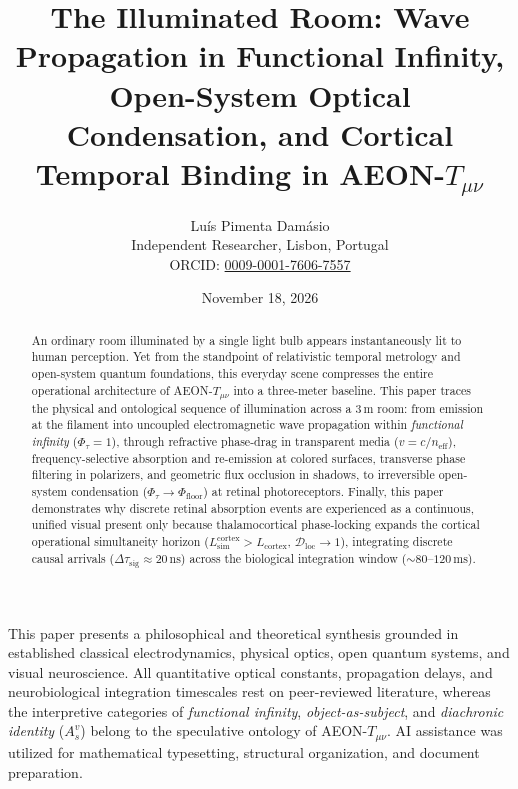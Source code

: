 \documentclass[11pt,a4paper]{article}
\title{\textbf{The Illuminated Room: Wave Propagation in Functional Infinity, Open-System Optical Condensation, and Cortical Temporal Binding in AEON-$T_{\mu\nu}$}}
\author{Lu\'is Pimenta Dam\'asio\\
\small Independent Researcher, Lisbon, Portugal\\
\small ORCID: \href{https://orcid.org/0009-0001-7606-7557}{0009-0001-7606-7557}}
\date{November 18, 2026}
\begin{document}
\maketitle

\begin{abstract}
An ordinary room illuminated by a single light bulb appears instantaneously lit to human perception. Yet from the standpoint of relativistic temporal metrology and open-system quantum foundations, this everyday scene compresses the entire operational architecture of AEON-$T_{\mu\nu}$ into a three-meter baseline. This paper traces the physical and ontological sequence of illumination across a $3\,\mathrm{m}$ room: from emission at the filament into uncoupled electromagnetic wave propagation within \emph{functional infinity} ($\Phi_\tau = 1$), through refractive phase-drag in transparent media ($v = c / n_{\mathrm{eff}}$), frequency-selective absorption and re-emission at colored surfaces, transverse phase filtering in polarizers, and geometric flux occlusion in shadows, to irreversible open-system condensation ($\Phi_\tau \to \Phi_{\mathrm{floor}}$) at retinal photoreceptors. Finally, this paper demonstrates why discrete retinal absorption events are experienced as a continuous, unified visual present only because thalamocortical phase-locking expands the cortical operational simultaneity horizon ($L_{\mathrm{sim}}^{\mathrm{cortex}} > L_{\mathrm{cortex}}$, $\mathcal{D}_{\mathrm{loc}} \to 1$), integrating discrete causal arrivals ($\Delta\tau_{\mathrm{sig}} \approx 20\,\mathrm{ns}$) across the biological integration window ($\sim 80\text{--}120\,\mathrm{ms}$).
\end{abstract}

\begin{tcolorbox}[colback=gray!6,colframe=gray!50,title=\textbf{Epistemic Status \& AI Collaboration Disclosure}]
\small
This paper presents a philosophical and theoretical synthesis grounded in established classical electrodynamics, physical optics, open quantum systems, and visual neuroscience. All quantitative optical constants, propagation delays, and neurobiological integration timescales rest on peer-reviewed literature, whereas the interpretive categories of \emph{functional infinity}, \emph{object-as-subject}, and \emph{diachronic identity} ($A_s^v$) belong to the speculative ontology of AEON-$T_{\mu\nu}$. AI assistance was utilized for mathematical typesetting, structural organization, and document preparation.
\end{tcolorbox}
\end{document}
